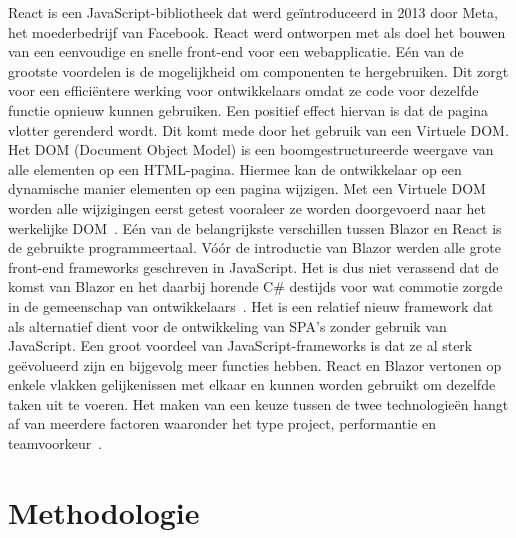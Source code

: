 \documentclass{hogent-article}
\begin{document}
\newline\newline
React is een JavaScript-bibliotheek dat werd geïntroduceerd in 2013 door Meta, het moederbedrijf van Facebook. React werd ontworpen met als doel het bouwen van een eenvoudige en snelle front-end voor een webapplicatie. Eén van de grootste voordelen is de mogelijkheid om componenten te hergebruiken. Dit zorgt voor een efficiëntere werking voor ontwikkelaars omdat ze code voor dezelfde functie opnieuw kunnen gebruiken. Een positief effect hiervan is dat de pagina vlotter gerenderd wordt. Dit komt mede door het gebruik van een Virtuele DOM. Het DOM (Document Object Model) is een boomgestructureerde weergave van alle elementen op een HTML-pagina. Hiermee kan de ontwikkelaar op een dynamische manier elementen op een pagina wijzigen. Met een Virtuele DOM worden alle wijzigingen eerst getest vooraleer ze worden doorgevoerd naar het werkelijke DOM~\autocite{Gundaniya2023}.
\newline\newline
Eén van de belangrijkste verschillen tussen Blazor en React is de gebruikte programmeertaal. Vóór de introductie van Blazor werden alle grote front-end frameworks geschreven in JavaScript. Het is dus niet verassend dat de komst van Blazor en het daarbij horende C\# destijds voor wat commotie zorgde in de gemeenschap van ontwikkelaars~\autocite{Davidson2022}. Het is een relatief nieuw framework dat als alternatief dient voor de ontwikkeling van SPA's zonder gebruik van JavaScript. Een groot voordeel van JavaScript-frameworks is dat ze al sterk geëvolueerd zijn en bijgevolg meer functies hebben. React en Blazor vertonen op enkele vlakken gelijkenissen met elkaar en kunnen worden gebruikt om dezelfde taken uit te voeren. Het maken van een keuze tussen de twee technologieën hangt af van meerdere factoren waaronder het type project, performantie en teamvoorkeur~\autocite{Asiuwhu2022}. 

\section{Methodologie}%
\label{sec:methodologie}

\end{document}
